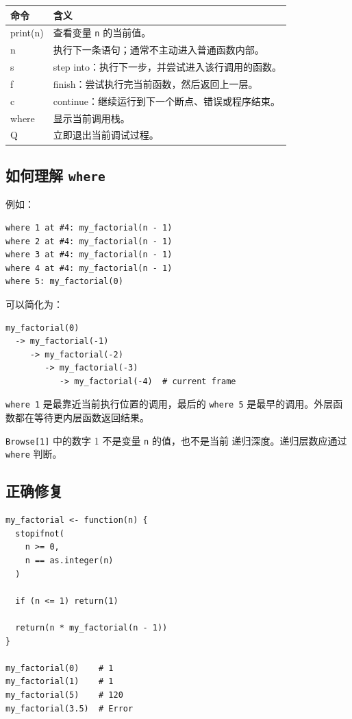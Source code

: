 \documentclass[11pt,a4paper]{ctexart}
\begin{document}
\begin{longtable}{>{\ttfamily}p{}p{}}
\toprule
\normalfont 命令 & 含义 \\
\midrule
\endhead
print(n) & 查看变量 \texttt{n} 的当前值。\\
n & 执行下一条语句；通常不主动进入普通函数内部。\\
s & step into：执行下一步，并尝试进入该行调用的函数。\\
f & finish：尝试执行完当前函数，然后返回上一层。\\
c & continue：继续运行到下一个断点、错误或程序结束。\\
where & 显示当前调用栈。\\
Q & 立即退出当前调试过程。\\
\bottomrule
\end{longtable}

\subsection{如何理解 \texttt{where}}

例如：

\begin{lstlisting}[style=textcode]
where 1 at #4: my_factorial(n - 1)
where 2 at #4: my_factorial(n - 1)
where 3 at #4: my_factorial(n - 1)
where 4 at #4: my_factorial(n - 1)
where 5: my_factorial(0)
\end{lstlisting}

可以简化为：

\begin{lstlisting}[style=textcode]
my_factorial(0)
  -> my_factorial(-1)
     -> my_factorial(-2)
        -> my_factorial(-3)
           -> my_factorial(-4)  # current frame
\end{lstlisting}

\texttt{where 1} 是最靠近当前执行位置的调用，最后的
\texttt{where 5} 是最早的调用。外层函数都在等待更内层函数返回结果。

\texttt{Browse[1]} 中的数字 1 不是变量 \lstinline|n| 的值，也不是当前
递归深度。递归层数应通过 \lstinline|where| 判断。

\subsection{正确修复}

\begin{lstlisting}[style=rcode]
my_factorial <- function(n) {
  stopifnot(
    n >= 0,
    n == as.integer(n)
  )

  if (n <= 1) return(1)

  return(n * my_factorial(n - 1))
}

my_factorial(0)    # 1
my_factorial(1)    # 1
my_factorial(5)    # 120
my_factorial(3.5)  # Error
\end{lstlisting}
\end{document}

